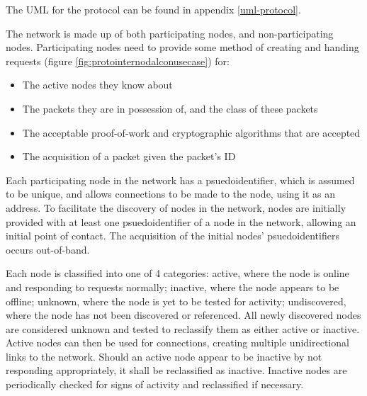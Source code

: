 The UML for the protocol can be found in appendix \ref{uml-protocol}.

The network is made up of both participating nodes, and non-participating nodes. Participating nodes need to provide some method of creating and handing requests (figure \ref{fig:protointernodalconusecase}) for: 
\begin{itemize}[topsep=-5pt,itemsep=-1ex,partopsep=2ex,parsep=1.5ex]
	\item The active nodes they know about
	\item The packets they are in possession of, and the class of these packets
	\item The acceptable proof-of-work and cryptographic algorithms that are accepted
	\item The acquisition of a packet given the packet's ID
\end{itemize} \vspace{0.7ex}

Each participating node in the network has a psuedoidentifier, which is assumed to be unique, and allows connections to be made to the node, using it as an address. To facilitate the discovery of nodes in the network, nodes are initially provided with at least one psuedoidentifier of a node in the network, allowing an initial point of contact. The acquisition of the initial nodes' psuedoidentifiers occurs out-of-band.

Each node is classified into one of 4 categories: active, where the node is online and responding to requests normally; inactive, where the node appears to be offline; unknown, where the node is yet to be tested for activity; undiscovered, where the node has not been discovered or referenced. All newly discovered nodes are considered unknown and tested to reclassify them as either active or inactive. Active nodes can then be used for connections, creating multiple unidirectional links to the network. Should an active node appear to be inactive by not responding appropriately, it shall be reclassified as inactive. Inactive nodes are periodically checked for signs of activity and reclassified if necessary. %


